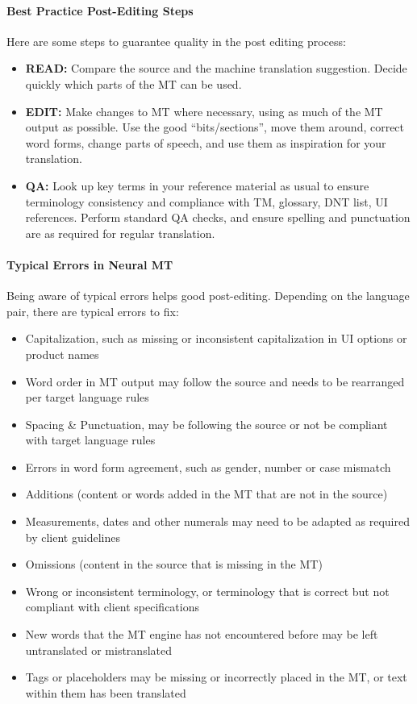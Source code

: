 \documentclass[11pt]{article}
\theoremstyle{plain}
\theoremstyle{definition}
\theoremstyle{remark}
\begin{document}
\paragraph{Best Practice Post-Editing Steps} Here are some steps to guarantee quality in the post editing process:
\begin{itemize}
    \item \textbf{READ:} Compare the source and the machine translation suggestion. Decide quickly which parts of the MT can be used.
    \item \textbf{EDIT:} Make changes to MT where necessary, using as much of the MT output as possible. Use the good “bits/sections”, move them around, correct word forms, change parts of speech, and use them as inspiration for your translation.
    \item \textbf{QA:} Look up key terms in your reference material as usual to ensure terminology consistency and compliance with TM, glossary, DNT list, UI references. Perform standard QA checks, and ensure spelling and punctuation are as required for regular translation.
\end{itemize}

\paragraph{Typical Errors in Neural MT}
Being aware of typical errors helps good post-editing. Depending on the language pair, there are typical errors to fix:

\begin{itemize}
    \item Capitalization, such as missing or inconsistent capitalization in UI options or product names
    \item Word order in MT output may follow the source and needs to be rearranged per target language rules
    \item Spacing \& Punctuation, may be following the source or not be compliant with target language rules
    \item Errors in word form agreement, such as gender, number or case mismatch
    \item Additions (content or words added in the MT that are not in the source)
    \item Measurements, dates and other numerals may need to be adapted as required by client guidelines
    \item Omissions (content in the source that is missing in the MT)
    \item Wrong or inconsistent terminology, or terminology that is correct but not compliant with client specifications
    \item New words that the MT engine has not encountered before may be left untranslated or mistranslated
    \item Tags or placeholders may be missing or incorrectly placed in the MT, or text within them has been translated
\end{itemize}
\end{document}
